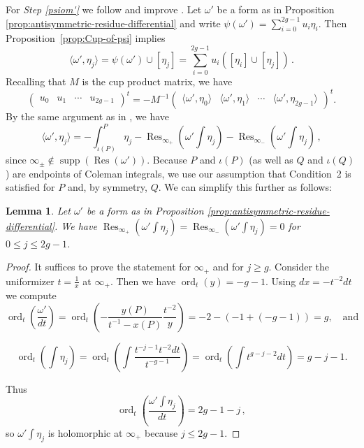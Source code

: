 \documentclass[11pt, a4paper]{amsart}
\newcommand{\Res}{\operatorname{Res}}
\newcommand{\supp}{\operatorname{supp}}
\newcommand{\ord}{\operatorname{ord}}
\newtheorem{lemma}[theorem]{Lemma}
\theoremstyle{remark}
\numberwithin{equation}{section}
\newcommand{\sg}{{}}
\begin{document}
For {\it Step \eqref{psiom'}}  we follow and improve \cite[\S5.2]{BBHeights}.
Let $\omega'$ be a form as in Proposition \ref{prop:antisymmetric-residue-differential} and write
$\psi(\omega')=\sum_{i=0}^{2g-1}u_i\eta_i$. Then Proposition~\ref{prop:Cup-of-psi} implies
$$\langle\omega',\eta_j \rangle=\psi(\omega')\cup
[\eta_j]=\sum_{i=0}^{2g-1}u_i([\eta_i]\cup[\eta_j])\,.$$
Recalling that $M$ is the cup product matrix, we have
  \begin{equation}\label{cupsymbol}
\begin{pmatrix}
u_0 & u_1 & \cdots & u_{2g-1}
\end{pmatrix}^t =-M^{-1}\begin{pmatrix}
    \langle \omega',\eta_0\rangle  &
   \langle \omega',\eta_1\rangle  &
   \cdots &
    \langle \omega',\eta_{2g-1}\rangle 
\end{pmatrix}^t.
  \end{equation}
By the same argument as in \cite[Proposition 5.12]{BBHeights}, we have
\[
\langle\omega',\eta_j\rangle=-\int_{\iota(P)}^P\eta_j-\Res_{\infty_+}\left(\omega'\int\eta_j\right)-\Res_{\infty_-}\left(\omega'\int\eta_j\right)\,,
\]
since $\infty_{\pm}\notin\supp(\Res(\omega'))$.
Because $P$ and $\iota(P)$ (as well as $Q$ and $\iota(Q)$) are endpoints of
Coleman integrals, we use our assumption that
Condition~2 is satisfied for $P$ and, by symmetry, $Q$.
We can simplify this
further as follows:

\begin{lemma}\label{L:zero-residue-even}
\sg{Let $\omega'$ be a form as in Proposition \ref{prop:antisymmetric-residue-differential}.} We have $\Res_{\infty_+}\left(\omega'\int\eta_j\right)=\Res_{\infty_-}\left(\omega'\int\eta_j\right)=0$ for $0\leq j\leq 2g-1$.
\end{lemma}
\begin{proof}
It suffices to prove the statement for $\infty_+$ and for $j\geq g$.
  Consider the uniformizer $t=\frac{1}{x}$ at $\infty_+$. Then we have $\ord_t(y)=-g-1$. Using $dx=-t^{-2}dt$ we compute
\[
\ord_t\left(\dfrac{\omega'}{dt}\right)=\ord_t\left(-\dfrac{y(P)}{t^{-1}-x(P)}\dfrac{t^{-2}}{y}\right)=
  -2-(-1+(-g-1))=g,\quad \text{and}\] 

\[\ord_t\left(\int\eta_{j}\right)
  =\ord_t\left(\int \dfrac{t^{-j-1}t^{-2}dt}{t^{-g-1}}\right)= \ord_t\left(\int  t^{g-j-2}dt\right)=g-j-1.\]

Thus 
\[
\ord_t\left(\dfrac{\omega'\int\eta_{j}}{dt}\right)=2g-1-j\,,
\]
so $\omega'\int\eta_j$ is holomorphic at $\infty_+$ because $j\leq 2g-1$.
\end{proof}
\end{document}
